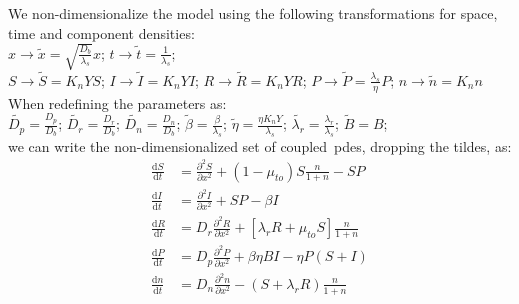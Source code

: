 We non-dimensionalize the model using the following transformations for space, time and component densities:\\
$x \rightarrow \tilde{x} = \sqrt{\frac{D_b}{\lambda_s}} x$; $t \rightarrow \tilde{t} = \frac{1}{\lambda_s}$; \\
$S \rightarrow \tilde{S} = K_n Y S$; $I \rightarrow \tilde{I} = K_n Y I$; $R \rightarrow \tilde{R} = K_n Y R$; $P \rightarrow \tilde{P} = \frac{\lambda_s}{\eta} P$; $n \rightarrow \tilde{n} = K_n n$\\
When redefining the parameters as:\\
$\tilde{D_p} = \frac{D_p}{D_b}$; $\tilde{D_r} = \frac{D_r}{D_b}$; $\tilde{D_n} = \frac{D_n}{D_b}$; $\tilde{\beta} = \frac{\beta}{\lambda_s}$; $\tilde{\eta} = \frac{\eta K_n Y}{\lambda_s}$; $\tilde{\lambda_r} = \frac{\lambda_r}{\lambda_s}$; $\tilde{B} = B$;\\
we can write the non-dimensionalized set of coupled~\gls{pde}s, dropping the tildes, as:
\begin{align}
    \frac{\text{d}S}{\text{d}t} &= \frac{\partial^2S}{\partial x^2} + \left( 1 - \mu_{to} \right) S \frac{n}{1+n}  - SP \\
    \frac{\text{d}I}{\text{d}t} &= \frac{\partial^2I}{\partial x^2} + SP - \beta I\\
    \frac{\text{d}R}{\text{d}t} &= D_r \frac{\partial^2R}{\partial x^2} + \left[\lambda_r R + \mu_{to} S \right] \frac{n}{1+n}\\
    \frac{\text{d}P}{\text{d}t} &= D_p \frac{\partial^2P}{\partial x^2} + \beta \eta BI - \eta P(S+I) \\
    \frac{\text{d}n}{\text{d}t} &= D_n \frac{\partial^2n}{\partial x^2} - \left( S + \lambda_r R \right) \frac{n}{1+n}
\end{align}
